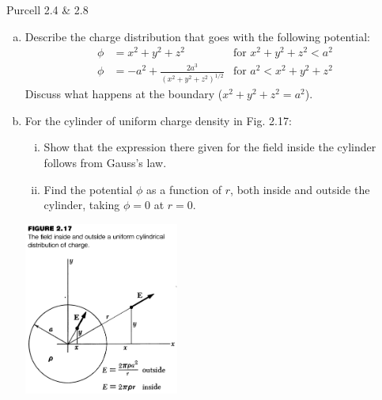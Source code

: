 \documentclass{esg8022pset}
\begin{document}
\begin{problem}{Purcell 2.4 \& 2.8}
  \begin{enumerate}[(a)]
    \item Describe the charge distribution that goes with the following potential: 
      \begin{align*}
        \phi & = x^2 + y^2 + z^2 & \text{for }x^2 + y^2 + z^2 < a^2 \\
        \phi & = -a^2 + \frac{2a^3}{(x^2 + y^2 + z^2)^{1/2}} & \text{for }a^2 < x^2 + y^2 + z^2
      \end{align*}
      Discuss what happens at the boundary ($x^2 + y^2 + z^2 = a^2$).
    \item For the cylinder of uniform charge density in Fig. 2.17:
      \begin{enumerate}[(i)]
        \item Show that the expression there given for the field inside the cylinder follows from Gauss's law.
        \item Find the potential $\phi$ as a function of $r$, both inside and outside the cylinder, taking $\phi = 0$ at $r = 0$. 
      \end{enumerate}
      \begin{center}\includegraphics[width=0.4\textwidth]{ps02_2}\end{center} 
  \end{enumerate}
\end{problem}
\end{document}
